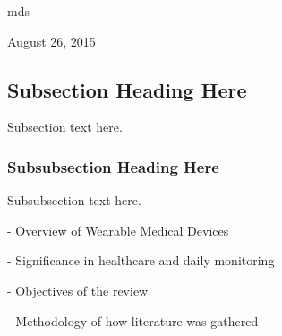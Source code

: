 \documentclass[journal]{IEEEtran}
\begin{document}
\hfill mds
 
\hfill August 26, 2015

\subsection{Subsection Heading Here}
Subsection text here.


\subsubsection{Subsubsection Heading Here}
Subsubsection text here.


- Overview of Wearable Medical Devices

- Significance in healthcare and daily monitoring

- Objectives of the review

- Methodology of how literature was gathered


%
%

\end{document}
